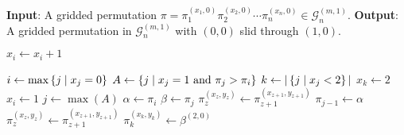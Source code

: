 {
\setphaserulewidth{.7pt}

\begin{algorithmic}[1]
\Statex \textbf{Input}: A gridded permutation $\pi = \pi_1^{(x_1,0)}\pi_2^{(x_2,0)} \cdots \pi_n^{(x_n,0)} \in \mathcal{G}^{(m,1)}_n$.
\Statex \textbf{Output}: A gridded permutation in $\mathcal{G}_n^{(m,1)}$ with $(0,0)$ slid through $(1,0)$.
        \State {}
    \EndIf
    
        \State $x_i \gets x_i + 1$
    \EndFor
    
        \State $i \gets \max\left\{j \mid x_j = 0\right\}$
        \State $A \gets \left\{j \mid x_j = 1 \text{ and } \pi_j > \pi_i\right\}$
        \State $k \gets |\left\{j \mid x_j < 2\right\}|$
            \State $x_k \gets 2$
            \State $x_i \gets 1$
        \Else
            \State $j \gets \max(A)$
            \State $\alpha \gets \pi_i$
            \State $\beta \gets \pi_j$
                \State $\pi_{z}^{(x_z,y_z)} \gets \pi_{z+1}^{(x_{z+1},y_{z+1})}$
            \EndFor
            \State $\pi_{j-1} \gets \alpha$
                \State $\pi_{z}^{(x_z,y_z)} \gets \pi_{z+1}^{(x_{z+1},y_{z+1})}$
            \EndFor
            \State $\pi_{k}^{(x_k,y_k)} \gets \beta^{(2,0)}$
        \EndIf
    \EndWhile
    \State {}
\EndProcedure
\end{algorithmic}

}